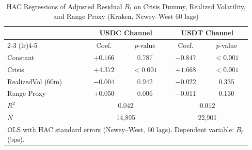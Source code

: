 \begin{table}[H]
\caption{HAC Regressions of Adjusted Residual $B_t$ on Crisis Dummy, Realized Volatility, and Range Proxy (Kraken, Newey--West 60 lags)}
\label{tab:regression_hac}
\footnotesize
\centering
\begin{tabular}{lcccc}
\toprule
 & \multicolumn{2}{c}{USDC Channel} & \multicolumn{2}{c}{USDT Channel} \\
\cmidrule(lr){2-3} \cmidrule(lr){4-5}
 & Coef. & $p$-value & Coef. & $p$-value \\
\midrule
Constant          & $+0.166$ & 0.787 & $-0.847$ & $<0.001$ \\
Crisis            & $+4.372$ & $<0.001$ & $+1.668$ & $<0.001$ \\
RealizedVol (60m) & $-0.004$ & 0.942 & $-0.022$ & 0.335 \\
Range Proxy       & $+0.050$ & 0.006 & $-0.011$ & 0.130 \\
\midrule
$R^2$             & \multicolumn{2}{c}{0.042} & \multicolumn{2}{c}{0.012} \\
$N$               & \multicolumn{2}{c}{14,895} & \multicolumn{2}{c}{22,901} \\
\bottomrule
\multicolumn{5}{l}{\footnotesize OLS with HAC standard errors (Newey--West, 60 lags). Dependent variable: $B_t$ (bps).}
\end{tabular}
\end{table}
